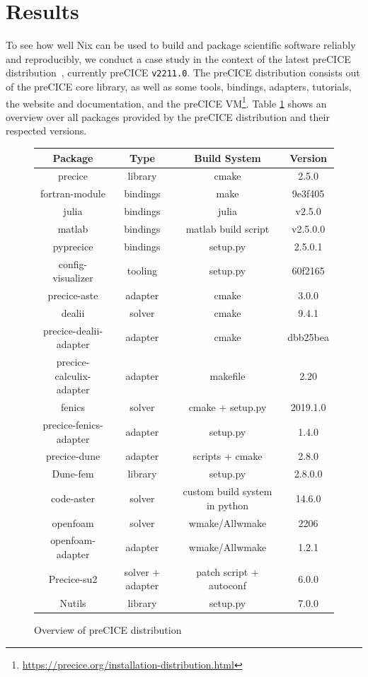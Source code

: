 \documentclass{eceasst}
\begin{document}
\section{Results}

To see how well Nix can be used to build and package scientific software reliably and reproducibly, we conduct a case study in the context of the latest preCICE distribution~\cite{preciceDistribution}, currently preCICE \texttt{v2211.0}.
The preCICE distribution consists out of the preCICE core library, as well as some tools, bindings, adapters, tutorials, the website and documentation, and the preCICE VM\footnote{\url{https://precice.org/installation-distribution.html}}.
Table \ref{table:label-distribution} shows an overview over all packages provided by the preCICE distribution and their respected versions.

\begin{figure}[!t]
  \normalsize
  \caption{Overview of preCICE distribution}
  \label{table:label-distribution}
  \centering
  \begin{tabular}{|c|c|c|c|}
    \hline
    \bfseries Package & \bfseries Type & \bfseries Build System & \bfseries Version \\ \hline
    precice & library & cmake & 2.5.0 \\ \hline
    fortran-module & bindings & make & 9e3f405 \\ \hline
    julia & bindings & julia & v2.5.0 \\ \hline
    matlab & bindings & matlab build script & v2.5.0.0 \\ \hline
    pyprecice & bindings & setup.py & 2.5.0.1 \\ \hline
    config-visualizer & tooling & setup.py & 60f2165 \\ \hline
    precice-aste & adapter & cmake & 3.0.0 \\ \hline
    dealii & solver & cmake & 9.4.1 \\ \hline
    precice-dealii-adapter & adapter & cmake & dbb25bea \\ \hline
    precice-calculix-adapter & adapter & makefile & 2.20 \\ \hline
    fenics & solver & cmake + setup.py & 2019.1.0 \\ \hline
    precice-fenics-adapter & adapter & setup.py & 1.4.0 \\ \hline
    precice-dune & adapter & scripts + cmake & 2.8.0 \\ \hline
    Dune-fem & library & setup.py & 2.8.0.0 \\ \hline
    code-aster & solver & custom build system in python & 14.6.0 \\ \hline
    openfoam & solver & wmake/Allwmake & 2206 \\ \hline
    openfoam-adapter & adapter & wmake/Allwmake & 1.2.1 \\ \hline
    Precice-su2 & solver + adapter & patch script + autoconf & 6.0.0 \\ \hline
    Nutils & library & setup.py & 7.0.0 \\ \hline
  \end{tabular}
\end{figure}
\end{document}
